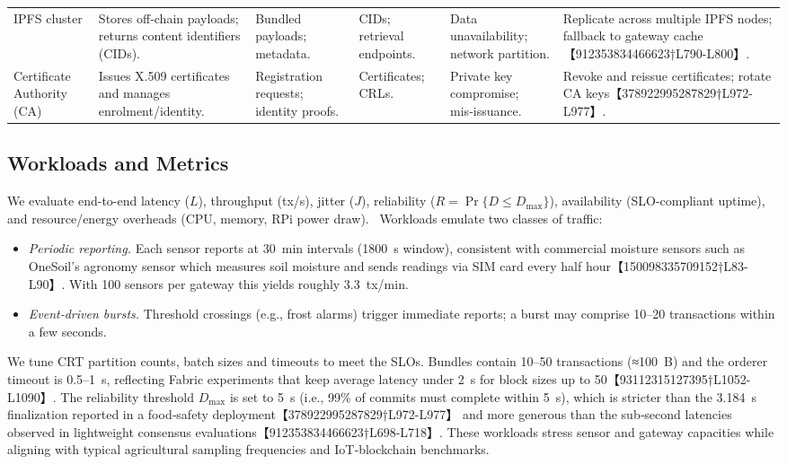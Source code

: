 \documentclass[12pt,onecolumn]{IEEEtran} %
\begin{document}
\begin{table*}[!t]
\begin{tabular}{p{2.5cm}p{3cm}p{2.7cm}p{2.7cm}p{3cm}p{3cm}}
    IPFS cluster & Stores off‑chain payloads; returns content identifiers (CIDs). & Bundled payloads; metadata. & CIDs; retrieval endpoints. & Data unavailability; network partition. & Replicate across multiple IPFS nodes; fallback to gateway cache【912353834466623†L790-L800】. \\
    Certificate Authority (CA) & Issues X.509 certificates and manages enrolment/identity. & Registration requests; identity proofs. & Certificates; CRLs. & Private key compromise; mis‑issuance. & Revoke and reissue certificates; rotate CA keys【378922995287829†L972-L977】. \\
    \bottomrule
  \end{tabular}
\end{table*}

\subsection{Workloads and Metrics}
We evaluate end-to-end latency ($L$), throughput (tx/s), jitter ($J$), reliability ($R=\Pr\{D\le D_{\max}\}$), availability (SLO-compliant uptime), and resource/energy overheads (CPU, memory, RPi power draw).\ %
Workloads emulate two classes of traffic:
\begin{itemize}
  \item \emph{Periodic reporting.}  Each sensor reports at 30~min intervals (1800~s window), consistent with commercial moisture sensors such as OneSoil’s agronomy sensor which measures soil moisture and sends readings via SIM card every half hour【150098335709152†L83-L90】.  With 100 sensors per gateway this yields roughly 3.3~tx/min.
  \item \emph{Event‑driven bursts.}  Threshold crossings (e.g., frost alarms) trigger immediate reports; a burst may comprise 10–20 transactions within a few seconds.
\end{itemize}
We tune CRT partition counts, batch sizes and timeouts to meet the SLOs.  Bundles contain 10–50 transactions (≈100~B) and the orderer timeout is 0.5–1~s, reflecting Fabric experiments that keep average latency under 2~s for block sizes up to 50【93112315127395†L1052-L1090】.  The reliability threshold $D_{\max}$ is set to 5~s (i.e., 99\% of commits must complete within 5~s), which is stricter than the 3.184~s finalization reported in a food‑safety deployment【378922995287829†L972-L977】 and more generous than the sub‑second latencies observed in lightweight consensus evaluations【912353834466623†L698-L718】.  These workloads stress sensor and gateway capacities while aligning with typical agricultural sampling frequencies and IoT‑blockchain benchmarks.
\end{document}
